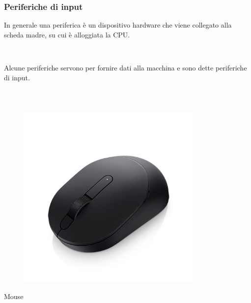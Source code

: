 \documentclass[]{beamer}
\begin{document}
\begin{frame}
\frametitle{Periferiche di input}
In generale una \alert<1>{periferica} è un dispositivo hardware che viene collegato alla scheda madre, su cui è alloggiata la CPU.

~

Alcune periferiche servono per \alert<1>{fornire dati alla macchina} e sono dette periferiche di input.

~

\begin{columns}
\begin{column}{.22\textwidth}
  \begin{center}
  \begin{figure}
    \includegraphics[width=\columnwidth]{img/mouse.jpg}
  \end{figure}
  Mouse
  \end{center}
\end{column}
\begin{column}{.22\textwidth}
  \begin{center}
    \begin{figure}

\end{figure}
\end{center}
\end{column}
\end{columns}
\end{frame}
\end{document}
